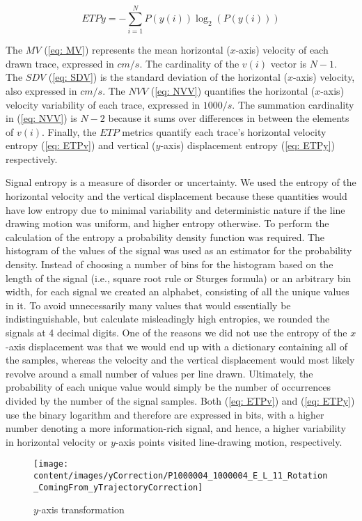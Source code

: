 \begin{equation} \label{eq: ETPy}
ETPy = -\sum_{i=1}^{N}P(y(i))\log_{2}(P(y(i)))
\end{equation}

\noindent
The $MV$ (\ref{eq: MV}) represents the mean horizontal ($x$-axis) velocity of each drawn trace, expressed in $cm/s$. The cardinality of the $v(i)$ vector is $N-1$. The $SDV$ (\ref{eq: SDV}) is the standard deviation of the horizontal ($x$-axis) velocity, also expressed in $cm/s$. The $NVV$ (\ref{eq: NVV}) quantifies the horizontal ($x$-axis) velocity variability of each trace, expressed in $1000/s$. The summation cardinality in (\ref{eq: NVV}) is $N-2$ because it sums over differences in between the elements of $v(i)$. Finally, the $ETP$ metrics quantify each trace's horizontal velocity entropy (\ref{eq: ETPv}) and vertical ($y$-axis) displacement entropy (\ref{eq: ETPy}) respectively. 

Signal entropy is a measure of disorder or uncertainty. We used the entropy of the horizontal velocity and the vertical displacement because these quantities would have low entropy due to minimal variability and deterministic nature if the line drawing motion was uniform, and higher entropy otherwise. To perform the calculation of the entropy a probability density function was required. The histogram of the values of the signal was used as an estimator for the probability density. Instead of choosing a number of bins for the histogram based on the length of the signal (i.e., square root rule or Sturges formula) or an arbitrary bin width, for each signal we created an alphabet, consisting of all the unique values in it. To avoid unnecessarily many values that would essentially be indistinguishable, but calculate misleadingly high entropies, we rounded the signals at 4 decimal digits. One of the reasons we did not use the entropy of the $x$-axis displacement was that we would end up with a dictionary containing all of the samples, whereas the velocity and the vertical displacement would most likely revolve around a small number of values per line drawn. Ultimately, the probability of each unique value would simply be the number of occurrences divided by the number of the signal samples. Both (\ref{eq: ETPv}) and (\ref{eq: ETPy}) use the binary logarithm and therefore are expressed in bits, with a higher number denoting a more information-rich signal, and hence, a higher variability in horizontal velocity or $y$-axis points visited line-drawing motion, respectively. 

\begin{figure}[h]
\centering
  \texttt{[image: content/images/yCorrection/P1000004\_1000004\_E\_L\_11\_Rotation\_ComingFrom\_yTrajectoryCorrection]}
\caption{$y$-axis transformation}
\label{fig:yCorrection}
\end{figure}

